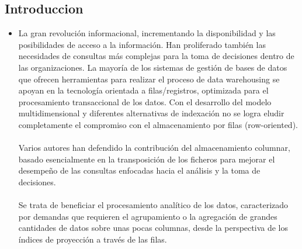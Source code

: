 \begin{itemize}
\subsection {Introduccion}

\begin{itemize}
	\item La gran revolución informacional, incrementando  la  disponibilidad  y  las  posibilidades  de  acceso  a  la  información. Han proliferado también las necesidades  de consultas más complejas para la toma de decisiones dentro de las organizaciones. La mayoría de los sistemas de gestión de bases de datos que ofrecen herramientas para realizar el proceso de data warehousing se apoyan en la tecnología orientada a filas/registros, optimizada para el procesamiento transaccional de los datos. Con el desarrollo del modelo multidimensional y diferentes alternativas de indexación no se logra eludir completamente el compromiso con el almacenamiento por filas (row-oriented).  
\\ \\
 Varios autores han defendido la contribución del almacenamiento columnar, basado  esencialmente en  la transposición  de los  ficheros para  mejorar  el desempeño  de las  consultas enfocadas hacia el análisis y la toma de decisiones.
\\ \\
Se trata de beneficiar el procesamiento analítico de los  datos,  caracterizado  por  demandas  que  requieren  el  agrupamiento  o  la  agregación  de  grandes cantidades de datos sobre unas pocas columnas, desde la perspectiva de los índices de proyección a través de las filas.
	
\end{itemize} 


\end{itemize}

